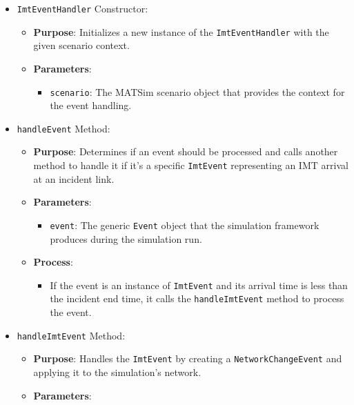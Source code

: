 \documentclass[fancy, oneside, mastersfancy, ms]{byuthesis}
\providecommand{\tightlist}{%
  \setlength{\itemsep}{0pt}\setlength{\parskip}{0pt}}\usepackage{longtable,booktabs,array}
\begin{document}
\begin{itemize}
\tightlist
\item
  \texttt{ImtEventHandler} Constructor:

  \begin{itemize}
  \tightlist
  \item
    \textbf{Purpose}: Initializes a new instance of the
    \texttt{ImtEventHandler} with the given scenario context.
  \item
    \textbf{Parameters}:

    \begin{itemize}
    \tightlist
    \item
      \texttt{scenario}: The MATSim scenario object that provides the
      context for the event handling.
    \end{itemize}
  \end{itemize}
\item
  \texttt{handleEvent} Method:

  \begin{itemize}
  \tightlist
  \item
    \textbf{Purpose}: Determines if an event should be processed and
    calls another method to handle it if it's a specific
    \texttt{ImtEvent} representing an IMT arrival at an incident link.
  \item
    \textbf{Parameters}:

    \begin{itemize}
    \tightlist
    \item
      \texttt{event}: The generic \texttt{Event} object that the
      simulation framework produces during the simulation run.
    \end{itemize}
  \item
    \textbf{Process}:

    \begin{itemize}
    \tightlist
    \item
      If the event is an instance of \texttt{ImtEvent} and its arrival
      time is less than the incident end time, it calls the
      \texttt{handleImtEvent} method to process the event.
    \end{itemize}
  \end{itemize}
\item
  \texttt{handleImtEvent} Method:

  \begin{itemize}
  \tightlist
  \item
    \textbf{Purpose}: Handles the \texttt{ImtEvent} by creating a
    \texttt{NetworkChangeEvent} and applying it to the simulation's
    network.
  \item
    \textbf{Parameters}:


\end{itemize}
\end{itemize}
\end{document}

